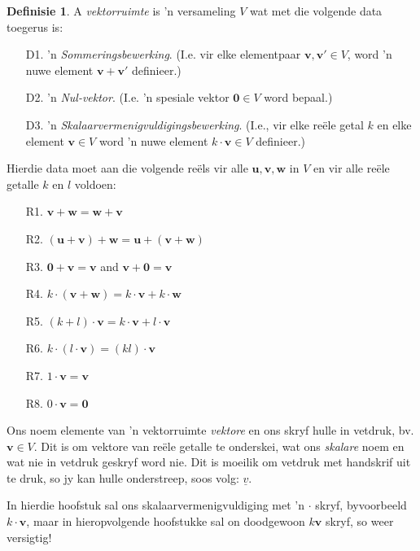 \documentclass[a4paper,11pt]{book}
\theoremstyle{definition}
\newtheorem{definition}[theorem]{Definisie}
\newcommand{\ve}[1]{\mathbf{#1}}
\begin{document}
\begin{definition} A \emph{vektorruimte} is 'n versameling $V$ wat met die
	volgende data toegerus is: \label{defnvec}
	\begin{itemize}
		\item[D1.] 'n \emph{Sommeringsbewerking}.  (I.e. vir elke
			elementpaar $\ve{v}, \ve{v}' \in V$, word 'n nuwe element
			$\ve{v} + \ve{v}'$ definieer.)
		\item[D2.] 'n \emph{Nul-vektor}. (I.e. 'n spesiale vektor $\ve{0}
			\in V$ word bepaal.)
		\item[D3.] 'n \emph{ Skalaarvermenigvuldigingsbewerking}. (I.e.,
			vir elke re{\"e}le getal $k$ en elke element $\ve{v} \in V$
			word 'n nuwe element $k \cdot \ve{v} \in V$ definieer.)
	\end{itemize}

	Hierdie data moet aan die volgende re{\"e}ls vir alle $\ve{u}, \ve{v},
	\ve{w}$ in $V$ en vir alle re{\"e}le getalle $k$ en $l$ voldoen:
	\begin{enumerate}
		\item[R1.] $\ve{v} + \ve{w} = \ve{w} + \ve{v}$  \\
		\item[R2.] $(\ve{u} + \ve{v}) + \ve{w} = \ve{u} + (\ve{v} +
			\ve{w})$ \\
		\item[R3.] $\ve{0} + \ve{v} = \ve{v}$ and $\ve{v} + \ve{0} =
			\ve{v}$\\
		\item[R4.] $k \cdot (\ve{v} + \ve{w}) = k \cdot \ve{v} + k \cdot
			\ve{w}$
		\item[R5.] $(k + l) \cdot \ve{v} = k \cdot \ve{v} + l \cdot
			{\ve{v}}$
		\item[R6.] $k \cdot (l \cdot \ve{v}) = (kl) \cdot \ve{v}$
		\item[R7.] $1 \cdot \ve{v} = \ve{v}$
		\item[R8.] $0 \cdot \ve{v} = \ve{0}$
	\end{enumerate}
\end{definition}

Ons noem elemente van 'n vektorruimte \emph{vektore} en ons skryf hulle in
vetdruk, bv. $\ve{v} \in V$. Dit is om vektore van re{\"e}le getalle te
onderskei, wat ons \emph{skalare} noem en wat nie in vetdruk geskryf word
nie. Dit is moeilik om vetdruk met handskrif uit te druk, so jy kan hulle
onderstreep, soos volg: $\underline{v}$.

In hierdie hoofstuk sal ons skalaarvermenigvuldiging met 'n $\cdot$ skryf,
byvoorbeeld $k \cdot \ve{v}$, maar in hieropvolgende hoofstukke sal on
doodgewoon $k \ve{v}$ skryf, so weer versigtig!
\end{document}
